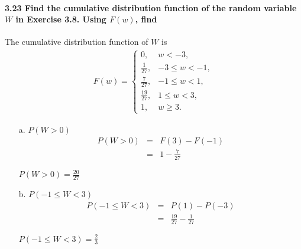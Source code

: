 \documentclass{article}
\begin{document}
\paragraph{3.23 Find the cumulative distribution function of the 
random variable $W$ in Exercise 3.8. Using $F(w)$, find\\}
The cumulative distribution function of $W$ is\\
\begin{eqnarray*}
F(w)=\left\{\begin{array}{ll}
  0, & w< -3,\\
  \frac{1}{27}, & -3 \leq w < -1,\\
  \frac{7}{27}, & -1 \leq w < 1,\\
  \frac{19}{27}, & 1 \leq w < 3,\\
  1, & w \geq 3.
  \end{array}\right.
\end{eqnarray*}
\begin{enumerate}
\item[a.] $P(W>0)$
\begin{eqnarray*}
  P(W>0) & = & F(3)-F(-1)\\
         & = & 1-\frac{7}{27}
\end{eqnarray*}
\begin{center}
$\boxed{P(W>0)=\frac{20}{27}}$
\end{center}

\item[b.] $P(-1 \leq W < 3)$
\begin{eqnarray*}
  P(-1 \leq W<3) & = & P(1)-P(-3)\\
                 & = & \frac{19}{27}-\frac{1}{27}
\end{eqnarray*}
\begin{center}
$\boxed{P(-1 \leq W<3)=\frac{2}{3}}$
\end{center}
\end{enumerate}
\end{document}
